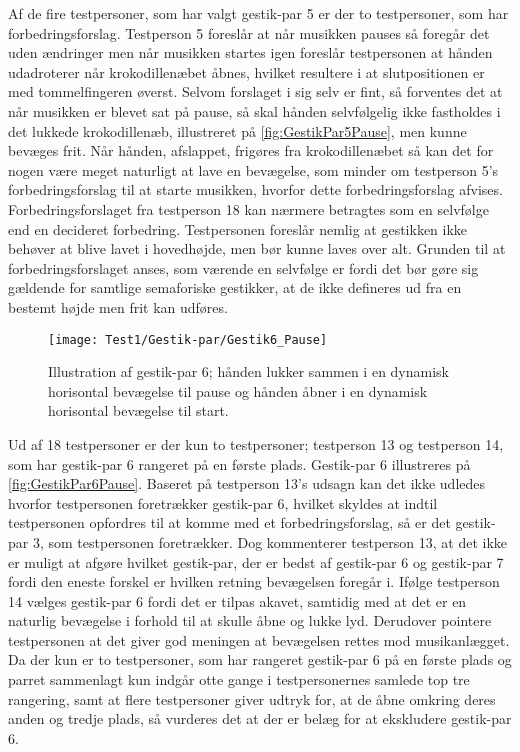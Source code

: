 Af de fire testpersoner, som har valgt gestik-par 5 er der to testpersoner, som har forbedringsforslag. Testperson 5 foreslår at når musikken pauses så foregår det uden ændringer men når musikken startes igen foreslår testpersonen at hånden udadroterer når krokodillenæbet åbnes, hvilket resultere i at slutpositionen er med tommelfingeren øverst. Selvom forslaget i sig selv er fint, så forventes det at når musikken er blevet sat på pause, så skal hånden selvfølgelig ikke fastholdes i det lukkede krokodillenæb, illustreret på \autoref{fig:GestikPar5Pause}, men kunne bevæges frit. Når hånden, afslappet, frigøres fra krokodillenæbet så kan det for nogen være meget naturligt at lave en bevægelse, som minder om testperson 5's forbedringsforslag til at starte musikken, hvorfor dette forbedringsforslag afvises. Forbedringsforslaget fra testperson 18 kan nærmere betragtes som en selvfølge end en decideret forbedring. Testpersonen foreslår nemlig at gestikken ikke behøver at blive lavet i hovedhøjde, men bør kunne laves over alt. Grunden til at forbedringsforslaget anses, som værende en selvfølge er fordi det bør gøre sig gældende for samtlige semaforiske gestikker, at de ikke defineres ud fra en bestemt højde men frit kan udføres.
%
\begin{figure}[H]
	\centering
	\texttt{[image: Test1/Gestik-par/Gestik6\_Pause]}
	\caption{Illustration af gestik-par 6; hånden lukker sammen i en dynamisk horisontal bevægelse til pause og hånden åbner i en dynamisk horisontal bevægelse til start.}
	\label{fig:GestikPar6Pause}
\end{figure}
\noindent
% 
Ud af 18 testpersoner er der kun to testpersoner; testperson 13 og testperson 14, som har gestik-par 6 rangeret på en første plads. Gestik-par 6 illustreres på \autoref{fig:GestikPar6Pause}. Baseret på testperson 13's udsagn kan det ikke udledes hvorfor testpersonen foretrækker gestik-par 6, hvilket skyldes at indtil testpersonen opfordres til at komme med et forbedringsforslag, så er det gestik-par 3, som testpersonen foretrækker. Dog kommenterer testperson 13, at det ikke er muligt at afgøre hvilket gestik-par, der er bedst af gestik-par 6 og gestik-par 7 fordi den eneste forskel er hvilken retning bevægelsen foregår i. Ifølge testperson 14 vælges gestik-par 6 fordi det er tilpas akavet, samtidig med at det er en naturlig bevægelse i forhold til at skulle åbne og lukke lyd. Derudover pointere testpersonen at det giver god meningen at bevægelsen rettes mod musikanlægget. Da der kun er to testpersoner, som har rangeret gestik-par 6 på en første plads og parret sammenlagt kun indgår otte gange i testpersonernes samlede top tre rangering, samt at flere testpersoner giver udtryk for, at de åbne omkring deres anden og tredje plads, så vurderes det at der er belæg for at ekskludere gestik-par 6. 
